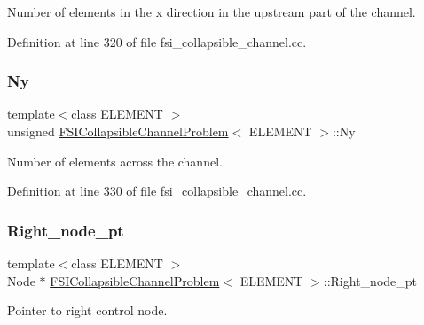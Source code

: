 Number of elements in the x direction in the upstream part of the channel. 



Definition at line 320 of file fsi\+\_\+collapsible\+\_\+channel.\+cc.

\mbox{\label{classFSICollapsibleChannelProblem_a536804b714fd0033f3028ff1c6032918}} 
\subsubsection{\texorpdfstring{Ny}{Ny}}
{\footnotesize\ttfamily template$<$class E\+L\+E\+M\+E\+NT $>$ \\
unsigned \hyperlink{classFSICollapsibleChannelProblem}{F\+S\+I\+Collapsible\+Channel\+Problem}$<$ E\+L\+E\+M\+E\+NT $>$\+::Ny\hspace{0.3cm}{\ttfamily [private]}}



Number of elements across the channel. 



Definition at line 330 of file fsi\+\_\+collapsible\+\_\+channel.\+cc.

\mbox{\label{classFSICollapsibleChannelProblem_a194e116e377045afba000fba80a46fa8}} 
\subsubsection{\texorpdfstring{Right\+\_\+node\+\_\+pt}{Right\_node\_pt}}
{\footnotesize\ttfamily template$<$class E\+L\+E\+M\+E\+NT $>$ \\
Node $\ast$ \hyperlink{classFSICollapsibleChannelProblem}{F\+S\+I\+Collapsible\+Channel\+Problem}$<$ E\+L\+E\+M\+E\+NT $>$\+::Right\+\_\+node\+\_\+pt\hspace{0.3cm}{\ttfamily [private]}}



Pointer to right control node. 



